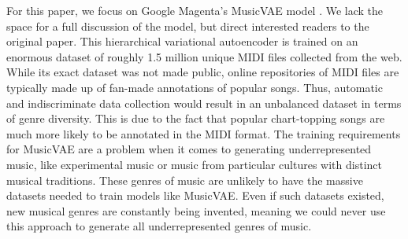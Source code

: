 \documentclass[letterpaper]{article}
\begin{document}
For this paper, we focus on Google Magenta's MusicVAE model \cite{musicvae2018}. We lack the space for a full discussion of the model, but direct interested readers to the original paper. This hierarchical variational autoencoder is trained on an enormous dataset of roughly 1.5 million unique MIDI files collected from the web. While its exact dataset was not made public, online repositories of MIDI files are typically made up of fan-made annotations of popular songs. Thus, automatic and indiscriminate data collection would result in an unbalanced dataset in terms of genre diversity. This is due to the fact that popular chart-topping songs are much more likely to be annotated in the MIDI format. 
The training requirements for MusicVAE are a problem when it comes to generating underrepresented music, like experimental music or music from particular cultures with distinct musical traditions.
These genres of music are unlikely to have the massive datasets needed to train models like MusicVAE. 
Even if such datasets existed, new musical genres are constantly being invented, meaning we could never use this approach to generate all underrepresented genres of music.
\end{document}
